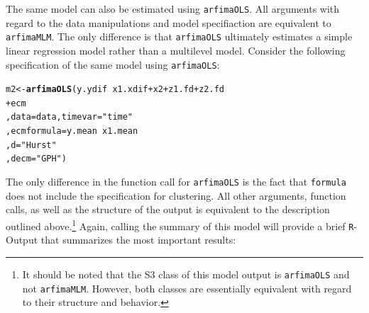 \documentclass[12pt]{paper}\usepackage[]{graphicx}\usepackage[]{color}
\makeatletter
\newcommand{\hlstr}[1]{\textcolor[rgb]{0.192,0.494,0.8}{#1}}%
\newcommand{\hlopt}[1]{\textcolor[rgb]{0,0,0}{#1}}%
\newcommand{\hlstd}[1]{\textcolor[rgb]{0.345,0.345,0.345}{#1}}%
\newcommand{\hlkwb}[1]{\textcolor[rgb]{0.69,0.353,0.396}{#1}}%
\newcommand{\hlkwc}[1]{\textcolor[rgb]{0.333,0.667,0.333}{#1}}%
\newcommand{\hlkwd}[1]{\textcolor[rgb]{0.737,0.353,0.396}{\textbf{#1}}}%
\newenvironment{kframe}{%
 \def\at@end@of@kframe{}%
 \ifinner\ifhmode%
  \def\at@end@of@kframe{\end{minipage}}%
  \begin{minipage}{\columnwidth}%
 \fi\fi%
 \def\FrameCommand##1{\hskip\@totalleftmargin \hskip-\fboxsep
 \colorbox{shadecolor}{##1}\hskip-\fboxsep
     \hskip-\linewidth \hskip-\@totalleftmargin \hskip\columnwidth}%
 \MakeFramed {\advance\hsize-\width
   \@totalleftmargin\z@ \linewidth\hsize
   \@setminipage}}%
 {\par\unskip\endMakeFramed%
 \at@end@of@kframe}
\newenvironment{knitrout}{}{} %
\makeatother
\begin{document}
The same model can also be estimated using \texttt{arfimaOLS}. All arguments with regard to the data manipulations and model specifiaction are equivalent to \texttt{arfimaMLM}. The only difference is that \texttt{arfimaOLS} ultimately estimates a simple linear regression model rather than a multilevel model. Consider the following specification of the same model using \texttt{arfimaOLS}:

\begin{knitrout}
\color{fgcolor}\begin{kframe}
\begin{alltt}
\hlstd{m2} \hlkwb{<-} \hlkwd{arfimaOLS}\hlstd{(y.ydif} \hlopt{~} \hlstd{x1.xdif} \hlopt{+} \hlstd{x2} \hlopt{+} \hlstd{z1.fd} \hlopt{+} \hlstd{z2.fd}
                \hlopt{+} \hlstd{ecm}
                \hlstd{,} \hlkwc{data} \hlstd{= data,} \hlkwc{timevar} \hlstd{=} \hlstr{"time"}
                \hlstd{,} \hlkwc{ecmformula} \hlstd{= y.mean} \hlopt{~} \hlstd{x1.mean}
                \hlstd{,} \hlkwc{d} \hlstd{=} \hlstr{"Hurst"}
                \hlstd{,} \hlkwc{decm} \hlstd{=} \hlstr{"GPH"}\hlstd{)}
\end{alltt}
\end{kframe}
\end{knitrout}

The only difference in the function call for \texttt{arfimaOLS} is the fact that \texttt{formula} does not include the specification for clustering. All other arguments, function calls, as well as the structure of the output is equivalent to the description outlined above.\footnote{It should be noted that the S3 class of this model output is \texttt{arfimaOLS} and not \texttt{arfimaMLM}. However, both classes are essentially equivalent with regard to their structure and behavior.} Again, calling the summary of this model will provide a brief \texttt{R}-Output that summarizes the most important results:
\end{document}
